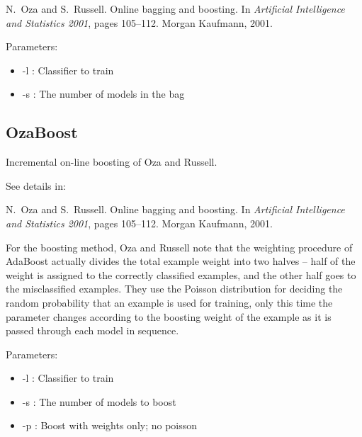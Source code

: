 \documentclass[a4paper,12pt,twoside]{book}
\begin{document}
\begin{itemize}
N.~Oza and S.~Russell.
\newblock Online bagging and boosting.
\newblock In {\em Artificial Intelligence and Statistics 2001}, pages 105--112.
  Morgan Kaufmann, 2001.
\end{itemize}

Parameters:
\begin{itemize}
\item -l : Classifier to train
\item -s : The number of models in the bag
\end{itemize}

\subsection{OzaBoost} Incremental on-line boosting of Oza and Russell.

See details in:

\begin{itemize}
N.~Oza and S.~Russell.
\newblock Online bagging and boosting.
\newblock In {\em Artificial Intelligence and Statistics 2001}, pages 105--112.
  Morgan Kaufmann, 2001.
\end{itemize}

For the boosting method, Oza and Russell 
note that the weighting procedure of AdaBoost actually divides the total example 
weight into two halves \--- half of the weight is assigned to the correctly
classified examples, and the other half goes to the misclassified examples. %
They use the Poisson distribution for 
deciding the random probability that an example is used for training, only this time
the parameter changes according to the boosting weight of the example
as it is passed through each model in sequence.

Parameters:
\begin{itemize}
\item -l : Classifier to train
\item -s : The number of models to boost
\item -p : Boost with weights only; no poisson
\end{itemize}
\end{document}
